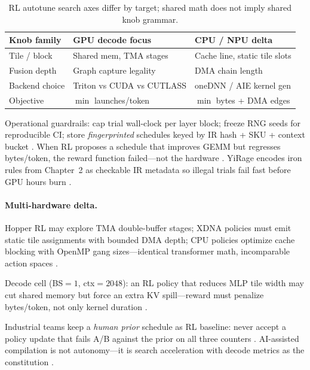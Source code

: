 \begin{table}[t]
\centering
\small
\begin{tabular}{@{}lll@{}}
\toprule
\textbf{Knob family} & \textbf{GPU decode focus} & \textbf{CPU / NPU delta} \\
\midrule
Tile / block & Shared mem, TMA stages & Cache line, static tile slots \\
Fusion depth & Graph capture legality & DMA chain length \\
Backend choice & Triton vs CUDA vs CUTLASS & oneDNN / AIE kernel gen \\
Objective & $\min$ launches/token & $\min$ bytes + DMA edges \\
\bottomrule
\end{tabular}
\caption{RL autotune search axes differ by target; shared math does not imply shared knob grammar.}
\label{tab:ch25_rl_search_axes}
\end{table}

Operational guardrails: cap trial wall-clock per layer block; freeze RNG seeds for reproducible CI; store \emph{fingerprinted} schedules keyed by IR hash + SKU + context bucket \citep{yirage2026,chen2020compilerbasedhardw}. When RL proposes a schedule that improves GEMM but regresses bytes/token, the reward function failed---not the hardware \citep{memoryfloor2026,dao2022flashattention,semianalysis2024tma}. YiRage encodes iron rules from Chapter~2 as checkable IR metadata so illegal trials fail fast before GPU hours burn \citep{yirage2026,kwon2023vllm,liu2024deepseekv3}.

\paragraph{Multi-hardware delta.} Hopper RL may explore TMA double-buffer stages; XDNA policies must emit static tile assignments with bounded DMA depth; CPU policies optimize cache blocking with OpenMP gang sizes---identical transformer math, incomparable action spaces \citep{semianalysis2024tma,amd2024xdna,dlbook}.

\begin{example}
Decode cell (BS${=}1$, ctx${=}2048$): an RL policy that reduces MLP tile width may cut shared memory but force an extra KV spill---reward must penalize bytes/token, not only kernel duration \citep{taxbreak2026,memoryfloor2026,yirage2026}.
\end{example}

Industrial teams keep a \emph{human prior} schedule as RL baseline: never accept a policy update that fails A/B against the prior on all three counters \citep{patel2025llminference,chen2020compilerbasedhardw,memoryfloor2026}. AI-assisted compilation is not autonomy---it is search acceleration with decode metrics as the constitution \citep{yirage2026,dlbook,amd2024aie}.

